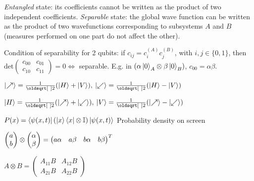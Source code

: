 \begin{squishlist}
    \item \emph{Entangled} state: its coefficients cannot be written as the product of two independent coefficients. 
        \emph{Separable} state: the global wave function can be written as the product of two wavefunctions corresponding to subsystems $A$ and $B$ (measures performed on one part do not affect the other).
    \item Condition of separability for 2 qubits: if $c_{ij} = c^{(A)}_i c^{(B)}_j$, with $i,j\in \{0,1\}$, then
        $\mathrm{det} \begin{pmatrix} c_{00} & c_{01} \\ c_{10} & c_{11} \end{pmatrix} = 0 \Leftrightarrow $ separable. E.g. in $\left(\alpha \ket{0}_A \otimes \beta \ket{0}_B\right)$, $c_{00} = \alpha \beta$.
\end{squishlist}


\begin{squishlist}
    \item $\ket{\nearrow} = \frac{1}{\sqrt{2}}(\ket{H}+\ket{V}),\: \ket{\swarrow} = \frac{1}{\sqrt{2}}(\ket{H} - \ket{V})$
    \item $\ket{H} = \frac{1}{\sqrt{2}}(\ket{\nearrow} + \ket{\swarrow}),\: \ket{V} = \frac{1}{\sqrt{2}}(\ket{\nearrow} - \ket{\swarrow})$
    \item $P(x) = \braket{\psi(x,t)|\left(\ket{x}\bra{x} \otimes \mathbb{I}\right)| \psi(x,t)}$ Probability density on screen
\end{squishlist}

\columnbreak
{}
$\begin{pmatrix} a \\ b \end{pmatrix} \otimes \begin{pmatrix} \alpha \\ \beta \end{pmatrix} = \begin{pmatrix} a \alpha & a \beta & b \alpha & b \beta \end{pmatrix}^T$

$A \otimes B = \begin{pmatrix} A_{11}B & A_{12}B \\ A_{21}B & A_{22}B \end{pmatrix}$

